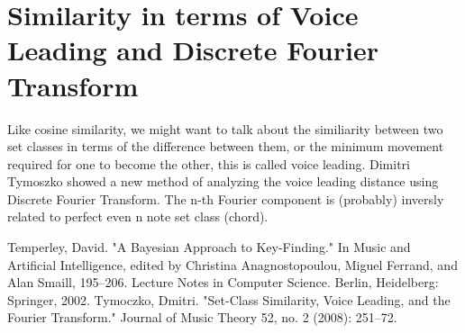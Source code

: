 \documentclass[12pt]{report}
\theoremstyle{definition}
\begin{document}
\section*{Similarity in terms of Voice Leading and Discrete Fourier Transform}
Like cosine similarity, we might want to talk about the similiarity between 
two set classes in terms of the difference between them, or the minimum movement
required for one to become the other, this is called voice leading. Dimitri Tymoszko
showed a new method of analyzing the voice leading distance using Discrete Fourier Transform.
The n-th Fourier component is (probably) inversly related to perfect even
n note set class (chord). 
\begin{thebibliography}{9}

Temperley, David. "A Bayesian Approach to Key-Finding." In Music and Artificial Intelligence, edited by Christina Anagnostopoulou, Miguel Ferrand, and Alan Smaill, 195–206. Lecture Notes in Computer Science. Berlin, Heidelberg: Springer, 2002.
Tymoczko, Dmitri. "Set-Class Similarity, Voice Leading, and the Fourier Transform." Journal of Music Theory 52, no. 2 (2008): 251–72.


\end{thebibliography}
\end{document}
